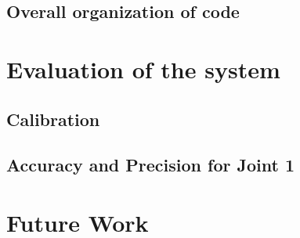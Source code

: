 \documentclass[10pt,a4paper]{article}
\begin{document}
\subsection{Overall organization of code}

\section{Evaluation of the system}

\subsection{Calibration}
\subsection{Accuracy and Precision for Joint 1}

\section{Future Work}
\end{document}
